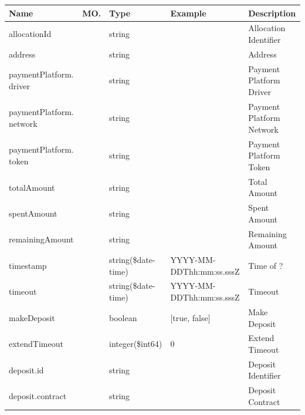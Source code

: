 \begin{enumerate}
\begin{table}[H]
\footnotesize

\begin{center}
\begin{tabular}{|p{3cm}|l|p{3cm}|p{3cm}|p{4cm}|} 
\hline
\rowcolor{lightgray}	Name	& MO.	& Type	& Example & 	Description \\
\hline

allocationId				&	&	string				&								&	Allocation Identifier \\
\hline   

address						&	&	string				&								&	Address	 \\
\hline   
  
paymentPlatform. driver		&	&	string				&								&	Payment Platform Driver \\
\hline   

paymentPlatform. network	&	&	string				&								&	Payment Platform Network \\
\hline   
  
paymentPlatform. token		&	&	string				&								&	Payment Platform Token \\
\hline
     
totalAmount					&	&	string				&								&	Total Amount \\
\hline

spentAmount					&	&	string				&								&	Spent Amount \\
\hline

remainingAmount				&	&	string				&								&	Remaining Amount \\
\hline

timestamp					&   &	string(\$date-time)	&	YYYY-MM-DDThh:mm:ss.sssZ	&	Time of ? \\
\hline

timeout						& 	& 	string(\$date-time)	&	YYYY-MM-DDThh:mm:ss.sssZ	&	Timeout \\ 
\hline

makeDeposit					& 	& 	boolean				&	[true, false]				&	Make Deposit \\ 
\hline

extendTimeout				& 	& 	integer(\$int64)	&	0							&	Extend Timeout \\ 
\hline

deposit.id					&   & 	string				&								&	Deposit Identifier \\
\hline

deposit.contract			&   &	string				&								&	Deposit Contract \\
\hline


\end{tabular}
\end{center}
\end{table}
\end{enumerate}
